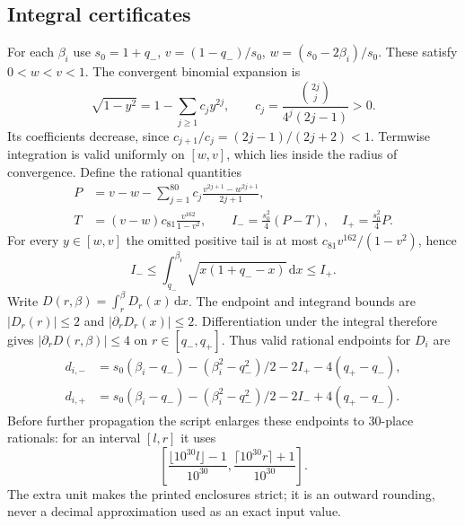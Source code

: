 \documentclass[review,supplement,hidelinks,onefignum,onetabnum]{siamart251216}
\newcommand{\dd}{\,\mathrm d}
\begin{document}
\subsection{Integral certificates}
For each $\beta_i$ use $s_0=1+q_-$,
$v=(1-q_-)/s_0$, $w=(s_0-2\beta_i)/s_0$. These satisfy $0<w<v<1$.
The convergent binomial expansion is
\[
\sqrt{1-y^2}=1-\sum_{j\ge1}c_jy^{2j},\qquad
c_j=\frac{\binom{2j}{j}}{4^j(2j-1)}>0.
\]
Its coefficients decrease, since $c_{j+1}/c_j=(2j-1)/(2j+2)<1$.
Termwise integration is valid uniformly on $[w,v]$, which lies inside
the radius of convergence. Define the rational quantities
\begin{align*}
P&=v-w-\sum_{j=1}^{80}c_j\frac{v^{2j+1}-w^{2j+1}}{2j+1},\\
T&=(v-w)c_{81}\frac{v^{162}}{1-v^2},\qquad
I_-=\frac{s_0^2}{4}(P-T),\quad I_+=\frac{s_0^2}{4}P.
\end{align*}
For every $y\in[w,v]$ the omitted positive tail is at most
$c_{81}v^{162}/(1-v^2)$, hence
\[
I_-\le\int_{q_-}^{\beta_i}\sqrt{x(1+q_--x)}\dd x\le I_+.
\]
Write $D(r,\beta)=\int_r^\beta D_r(x)\dd x$. The endpoint and
integrand bounds are $|D_r(r)|\le2$ and $|\partial_rD_r(x)|\le2$.
Differentiation under the integral therefore gives
$|\partial_rD(r,\beta)|\le4$ on $r\in[q_-,q_+]$.
Thus valid rational endpoints for $D_i$ are
\begin{align*}
d_{i,-}&=s_0(\beta_i-q_-)-(\beta_i^2-q_-^2)/2-2I_+-4(q_+-q_-),\\
d_{i,+}&=s_0(\beta_i-q_-)-(\beta_i^2-q_-^2)/2-2I_-+4(q_+-q_-).
\end{align*}
Before further propagation the script enlarges these endpoints to
30-place rationals: for an interval $[l,r]$ it uses
\[
\left[\frac{\lfloor10^{30}l\rfloor-1}{10^{30}},
\frac{\lceil10^{30}r\rceil+1}{10^{30}}\right].
\]
The extra unit makes the printed enclosures strict; it is an outward
rounding, never a decimal approximation used as an exact input value.
\end{document}

